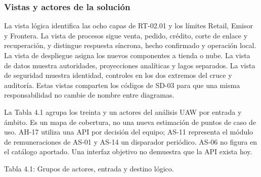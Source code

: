\documentclass[11pt]{article}
\begin{document}
\subsubsection{Vistas y actores de la solución}

La vista lógica identifica las ocho capas de RT-02.01 y los límites Retail, Emisor y Frontera. La vista de procesos sigue venta, pedido, crédito, corte de enlace y recuperación, y distingue respuesta síncrona, hecho confirmado y operación local. La vista de despliegue asigna los nuevos componentes a tienda o nube. La vista de datos muestra autoridades, proyecciones analíticas y lagos separados. La vista de seguridad muestra identidad, controles en los dos extremos del cruce y auditoría. Estas vistas comparten los códigos de SD-03 para que una misma responsabilidad no cambie de nombre entre diagramas.

La Tabla 4.1 agrupa los treinta y un actores del análisis UAW por entrada y ámbito. Es un mapa de cobertura, no una nueva estimación de puntos de caso de uso. AH-17 utiliza una API por decisión del equipo; AS-11 representa el módulo de remuneraciones de AS-01 y AS-14 un disparador periódico. AS-06 no figura en el catálogo aportado. Una interfaz objetivo no demuestra que la API exista hoy.

Tabla 4.1: Grupos de actores, entrada y destino lógico.
\end{document}
